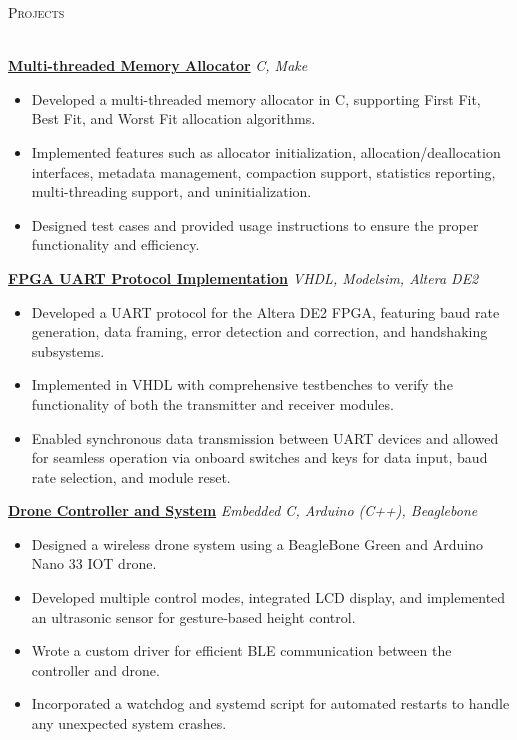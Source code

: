 \documentclass[a4paper]{article}
\newcommand{\lineunder} {
    \vspace*{-8pt} \\
    \hspace*{-18pt} \hrulefill\\
}
\newcommand{\header} [1] {
    {\hspace*{-18pt}\vspace*{6pt} \textsc{#1}}
    \vspace*{-6pt} \lineunder{}
}
\begin{document}
\header{Projects}
\vspace{1mm}

\href{https://github.com/SatireSage/Multi-threaded-Memory-Allocator}{\textbf{Multi-threaded Memory Allocator}} {\sl C, Make\/}
\vspace{-2mm}
\begin{itemize} \itemsep-3pt
    \item Developed a multi-threaded memory allocator in C, supporting First Fit, Best Fit, and Worst Fit allocation algorithms.
    \item Implemented features such as allocator initialization, allocation/deallocation interfaces, metadata management, compaction support, statistics reporting, multi-threading support, and uninitialization.
    \item Designed test cases and provided usage instructions to ensure the proper functionality and efficiency.
\end{itemize}

\href{https://github.com/SatireSage/FPGA-UART-Protocol}{\textbf{FPGA UART Protocol Implementation}} {\sl VHDL, Modelsim, Altera DE2\/}
\vspace{-2mm}
\begin{itemize} \itemsep-3pt
    \item Developed a UART protocol for the Altera DE2 FPGA, featuring baud rate generation, data framing, error detection and correction, and handshaking subsystems.
    \item Implemented in VHDL with comprehensive testbenches to verify the functionality of both the transmitter and receiver modules.
    \item Enabled synchronous data transmission between UART devices and allowed for seamless operation via onboard switches and keys for data input, baud rate selection, and module reset.
\end{itemize}

\href{https://github.com/SatireSage/Dronee}{\textbf{Drone Controller and System}} {\sl Embedded C, Arduino (C++), Beaglebone\/}
\vspace{-2mm}
\begin{itemize} \itemsep-3pt
    \item Designed a wireless drone system using a BeagleBone Green and Arduino Nano 33 IOT drone.
    \item Developed multiple control modes, integrated LCD display, and implemented an ultrasonic sensor for gesture-based height control.
    \item Wrote a custom driver for efficient BLE communication between the controller and drone.
    \item Incorporated a watchdog and systemd script for automated restarts to handle any unexpected system crashes.
\end{itemize}
\end{document}
